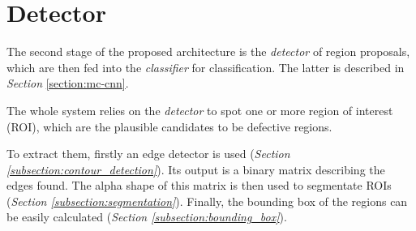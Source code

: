 \section{Detector}\label{section:region_proposals}
    \par{
        The second stage of the proposed architecture is the \emph{detector} of region proposals, which are then fed into the \emph{classifier} for classification. The latter is described in \emph{Section} \ref{section:mc-cnn}.
    }
    \par{
        The whole system relies on the \emph{detector} to spot one or more region of interest (ROI), which are the plausible candidates to be defective regions.
    }
    \par{
        To extract them, firstly an edge detector is used (\emph{Section \ref{subsection:contour_detection}}). Its output is a binary matrix describing the edges found. The alpha shape of this matrix is then used to segmentate ROIs (\emph{Section \ref{subsection:segmentation}}). Finally, the bounding box of the regions can be easily calculated (\emph{Section \ref{subsection:bounding_box}}).
    }
